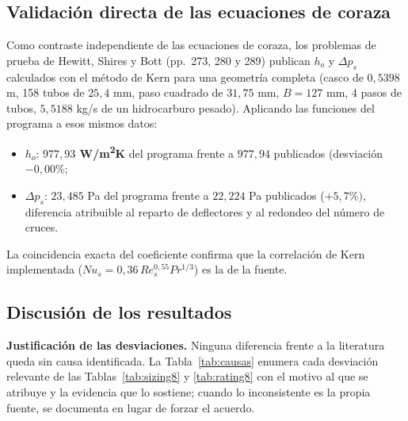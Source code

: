 \documentclass[11pt,a4paper]{article}
\begin{document}
\subsection{Validaci\'on directa de las ecuaciones de coraza}

Como contraste independiente de las ecuaciones de coraza, los problemas de
prueba de Hewitt, Shires y Bott \cite{hewitt} (pp.~273, 280 y
289) publican $h_o$ y
$\Delta p_s$ calculados con el m\'etodo de Kern para una geometr\'ia
completa (casco de $0{,}5398$ m, 158 tubos de $25{,}4$ mm, paso cuadrado de
$31{,}75$ mm, $B = 127$ mm, 4 pasos de tubos, $5{,}5188$ kg/s de un
hidrocarburo pesado). Aplicando las funciones del programa a esos mismos
datos:

\begin{itemize}[leftmargin=1.4em]
\item $h_o$: \textbf{$977{,}93$ W/m\textsuperscript{2}K} del programa
frente a $977{,}94$ publicados (desviaci\'on $-0{,}00\%$;
\item $\Delta p_s$: $23{,}485$ Pa del programa frente a $22{,}224$ Pa
publicados ($+5{,}7\%)$, diferencia atribuible al reparto de deflectores y
al redondeo del n\'umero de cruces.
\end{itemize}

La coincidencia exacta del coeficiente confirma que la correlaci\'on de
Kern implementada ($Nu_s = 0{,}36\,Re_s^{0{,}55}Pr^{1/3}$) es la de la
fuente.

\subsection{Discusi\'on de los resultados}
\label{sec:incertidumbre}

\textbf{Justificaci\'on de las desviaciones.} Ninguna diferencia frente a
la literatura queda sin causa identificada. La Tabla~\ref{tab:causas} enumera
cada desviaci\'on relevante de las Tablas~\ref{tab:sizing8} y
\ref{tab:rating8} con el motivo al que se atribuye y la evidencia que lo
sostiene; cuando lo inconsistente es la propia fuente, se documenta en lugar
de forzar el acuerdo.
\end{document}

